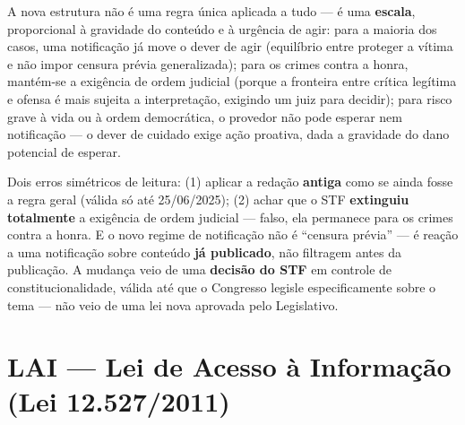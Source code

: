 \begin{conceito}
A nova estrutura não é uma regra única aplicada a tudo --- é uma
\textbf{escala}, proporcional à gravidade do conteúdo e à urgência de agir:
para a maioria dos casos, uma notificação já move o dever de agir
(equilíbrio entre proteger a vítima e não impor censura prévia
generalizada); para os crimes contra a honra, mantém-se a exigência de
ordem judicial (porque a fronteira entre crítica legítima e ofensa é mais
sujeita a interpretação, exigindo um juiz para decidir); para risco grave
à vida ou à ordem democrática, o provedor não pode esperar nem
notificação --- o dever de cuidado exige ação proativa, dada a gravidade
do dano potencial de esperar.
\end{conceito}

\begin{cuidado}
Dois erros simétricos de leitura: (1) aplicar a redação \textbf{antiga}
como se ainda fosse a regra geral (válida só até 25/06/2025); (2) achar
que o STF \textbf{extinguiu totalmente} a exigência de ordem judicial ---
falso, ela permanece para os crimes contra a honra. E o novo regime de
notificação não é “censura prévia” --- é reação a uma notificação sobre
conteúdo \textbf{já publicado}, não filtragem antes da publicação. A
mudança veio de uma \textbf{decisão do STF} em controle de
constitucionalidade, válida até que o Congresso legisle especificamente
sobre o tema --- não veio de uma lei nova aprovada pelo Legislativo.
\end{cuidado}

\section{LAI --- Lei de Acesso à Informação (Lei 12.527/2011)}

